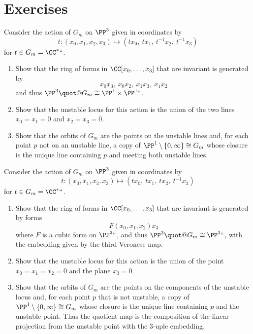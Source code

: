 \section{Exercises}

\begin{exercise}
Consider the action of $G_m$ on $\PP^3$ given in coordinates by
$$t: (x_0,x_1,x_2,x_3) \mapsto (tx_0,\ tx_1,\ t^{-1}x_2,\ t^{-1}x_3)
$$
for $t\in G_m = \CC^*` `$.
\begin{enumerate}
 \item Show that the ring  of forms in $\CC[x_0, \dots, x_3]$ that are
invariant
%
is generated by
$$
x_0x_3, \ x_0x_2,\ x_1x_3,\ x_1x_2
$$
and thus $\PP^3\quot @G_m\cong \PP^1\times \PP^1` `$.
\item Show that the
unstable locus
%
for this action is the union of the two lines $x_0=x_1=0$ and
$x_2=x_3=0$.
\item Show that the orbits of $G_m$ are the points on the unstable lines and, for each
point $p$ not on an unstable line, a copy of
$\PP^1\setminus \{0,\infty\}\cong G_m$ whose closure is the unique line containing $p$ and
meeting both unstable lines.
\end{enumerate}
\end{exercise}

\begin{exercise}
Consider the action of $G_m$ on $\PP^3$ given in coordinates by
$$t: (x_0,x_1,x_2,x_3) \mapsto (tx_0,\ tx_1,\ tx_2,\ t^{-1}x_3)
$$
for $t\in G_m = \CC^*` `$.
\begin{enumerate}
 \item Show that the ring  of forms in $\CC[x_0, \dots, x_3]$ that are invariant is generated by
 forms
%
$$
F(x_0,  x_1, x_2)x_3
$$
where $F$ is a cubic form on $\PP^2` `$, and thus
$\PP^3\quot@G_m\cong \PP^2` `$, with the embedding given by the
third Veronese map.
%
\item Show that the unstable locus for this action is the union of the point  $x_0=x_1=x_2 = 0$ and
%
the plane $x_3=0$.
\item Show that the orbits of $G_m$ are the points on the components of the unstable locus and, for each
point $p$ that is not unstable, a copy of
$\PP^1\setminus \{0,\infty\}\cong G_m$ whose closure is the unique line containing $p$ and the unstable
point. Thus the quotient map is the composition of the linear projection from the unstable point with the 3-uple
embedding.
\end{enumerate}
\end{exercise}

